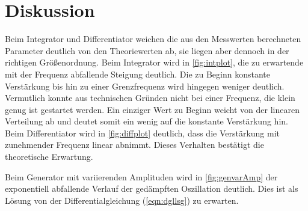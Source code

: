 \section{Diskussion}
\label{sec:Diskussion}


Beim Integrator und Differentiator weichen die aus den Messwerten berechneten Parameter deutlich von den Theoriewerten ab, sie liegen aber dennoch 
in der richtigen Größenordnung. Beim Integrator wird in \autoref{fig:intplot}, die zu erwartende mit der Frequenz abfallende Steigung deutlich. 
Die zu Beginn konstante Verstärkung bis hin zu einer Grenzfrequenz wird hingegen weniger deutlich. Vermutlich konnte aus technischen Gründen nicht 
bei einer Frequenz, die klein genug ist gestartet werden. Ein einziger Wert zu Beginn weicht von der linearen Verteilung ab und deutet somit ein 
wenig auf die konstante Verstärkung hin. Beim Differentiator wird in \autoref{fig:diffplot} deutlich, dass die Verstärkung mit zunehmender Frequenz linear 
abnimmt. Dieses Verhalten bestätigt die theoretische Erwartung.


Beim Generator mit variierenden Amplituden wird in \autoref{fig:genvarAmp} der exponentiell abfallende Verlauf der gedämpften Oszillation 
deutlich. Dies ist als Lösung von der Differentialgleichung (\autoref{eqn:dgllsg}) zu erwarten.